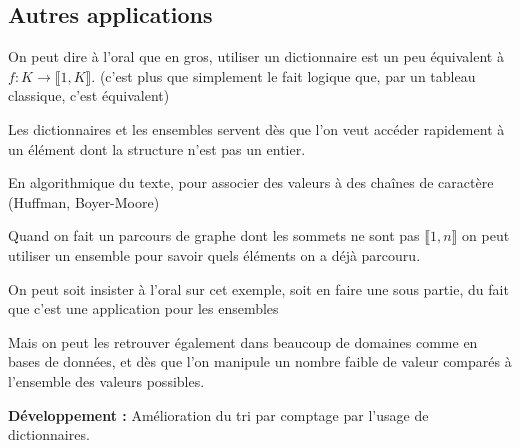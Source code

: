 \subsection{Autres applications}

\begin{com}
	On peut dire à l'oral que en gros, utiliser un dictionnaire est un peu équivalent à $f : K \to \llbracket 1, K \rrbracket$. (c'est plus que simplement le fait logique que, par un tableau classique, c'est équivalent)
\end{com}

Les dictionnaires et les ensembles servent dès que l'on veut accéder rapidement à un élément dont la structure n'est pas un entier.

\begin{example}
	En algorithmique du texte, pour associer des valeurs à des chaînes de caractère (Huffman, Boyer-Moore)
\end{example}

\begin{example}
	Quand on fait un parcours de graphe dont les sommets ne sont pas $\llbracket 1, n \rrbracket$ on peut utiliser un ensemble pour savoir quels éléments on a déjà parcouru.
\end{example}

\begin{com}
	On peut soit insister à l'oral sur cet exemple, soit en faire une sous partie, du fait que c'est une application pour les ensembles
\end{com}

Mais on peut les retrouver également dans beaucoup de domaines comme en bases de données, et dès que l'on manipule un nombre faible de valeur comparés à l'ensemble des valeurs possibles.

\textbf{Développement :} Amélioration du tri par comptage par l'usage de dictionnaires.